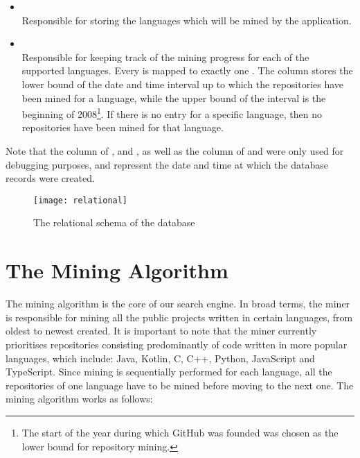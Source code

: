 \begin{itemize}
    \item {}
    \\Responsible for storing the languages which will be mined by the application.
    \item {}
    \\Responsible for keeping track of the mining progress for each of the supported languages. Every  is mapped to exactly one . The  column stores the lower bound of the date and time interval up to which the repositories have been mined for a language, while the upper bound of the interval is the beginning of 2008\footnote{The start of the year during which GitHub was founded was chosen as the lower bound for repository mining.}. If there is no entry for a specific language, then no repositories have been mined for that language.
\end{itemize}

Note that the  column of ,  and , as well as the  column of  and  were only used for debugging purposes, and represent the date and time at which the database records were created.

\begin{figure}[h!]
    \centering
    \texttt{[image: relational]}
    \caption{The relational schema of the database}
    \label{fig:1}
\end{figure}

\newpage
\section{The Mining Algorithm}

The mining algorithm is the core of our search engine.
In broad terms, the miner is responsible for mining all the public projects written in certain languages, from oldest to newest created.
It is important to note that the miner currently prioritises repositories consisting predominantly of code written in more popular languages, which include: Java, Kotlin, C, C++, Python, JavaScript and TypeScript.
Since mining is sequentially performed for each language, all the repositories of one language have to be mined before moving to the next one.
The mining algorithm works as follows:

